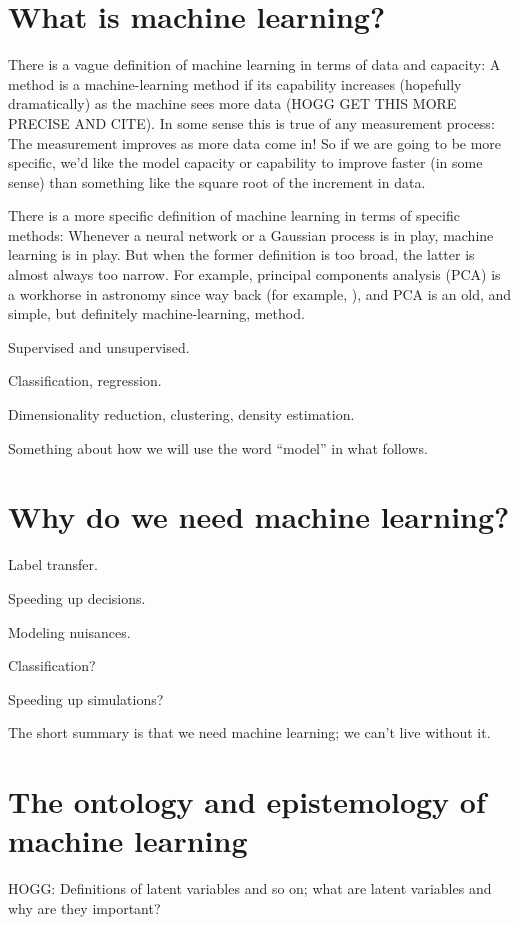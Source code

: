 \documentclass[11pt]{article}
\begin{document}
\section{What is machine learning?}\label{sec:what}

There is a vague definition of machine learning in terms of data and capacity:
A method is a machine-learning method if its capability increases (hopefully dramatically) as the machine sees more data (HOGG GET THIS MORE PRECISE AND CITE).
In some sense this is true of any measurement process:
The measurement improves as more data come in!
So if we are going to be more specific, we'd like the model capacity or capability to improve faster (in some sense) than something like the square root of the increment in data.

There is a more specific definition of machine learning in terms of specific methods:
Whenever a neural network or a Gaussian process is in play, machine learning is in play.
But when the former definition is too broad, the latter is almost always too narrow.
For example, principal components analysis (PCA) is a workhorse in astronomy since way back (for example, \cite{pcaredshift}), and PCA is an old, and simple, but definitely machine-learning, method.

Supervised and unsupervised.

Classification, regression.

Dimensionality reduction, clustering, density estimation.

Something about how we will use the word ``model'' in what follows.

\section{Why do we need machine learning?}

Label transfer.

Speeding up decisions.

Modeling nuisances.

Classification?

Speeding up simulations?

The short summary is that we need machine learning; we can't live without it.

\section{The ontology and epistemology of machine learning}

HOGG: Definitions of latent variables and so on; what are latent variables and why are they important?
\end{document}
